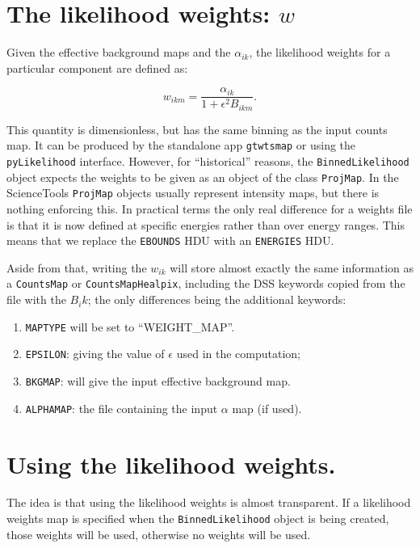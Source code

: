 \documentclass[preprint]{aastex}
\begin{document}
\section{The likelihood weights: \texorpdfstring{$w$}{w}}

Given the effective background maps and the $\alpha_{ik}$, the
likelihood weights for a particular component are defined as:

\begin{equation}
w_{ikm} = \frac{\alpha_{ik}}{1 + \epsilon^2 B_{ikm}}.
\end{equation}

This quantity is dimensionless, but has the same binning as the input
counts map.  It can be produced by the standalone app {\tt gtwtsmap}
or using the {\tt pyLikelihood} interface.  However, for
``historical'' reasons, the {\tt BinnedLikelihood} object expects the
weights to be given as an object of the class {\tt ProjMap}.  In the
ScienceTools {\tt ProjMap} objects usually represent intensity maps,
but there is nothing enforcing this.  In practical terms the only real
difference for a weights file is that it is now defined at specific
energies rather than over energy ranges.  This means that we replace
the {\tt EBOUNDS} HDU with an {\tt ENERGIES} HDU.

Aside from that, writing the $w_{ik}$ will store almost exactly the
same information as a {\tt CountsMap} or {\tt CountsMapHealpix},
including the DSS keywords copied from the file with the $B_ik$; the
only differences being the additional keywords:

\begin{enumerate}
\item{{\tt MAPTYPE} will be set to ``WEIGHT\_MAP''.}
\item{{\tt EPSILON}: giving the value of $\epsilon$ used in the computation;}
\item{{\tt BKGMAP}: will give the input effective background map.}    
\item{{\tt ALPHAMAP}: the file containing the input $\alpha$ map (if used).}
\end{enumerate}


\section{Using the likelihood weights.}

The idea is that using the likelihood weights is almost transparent.
If a likelihood weights map is specified when the {\tt BinnedLikelihood}
object is being created, those weights will be used, otherwise no
weights will be used.
\end{document}
